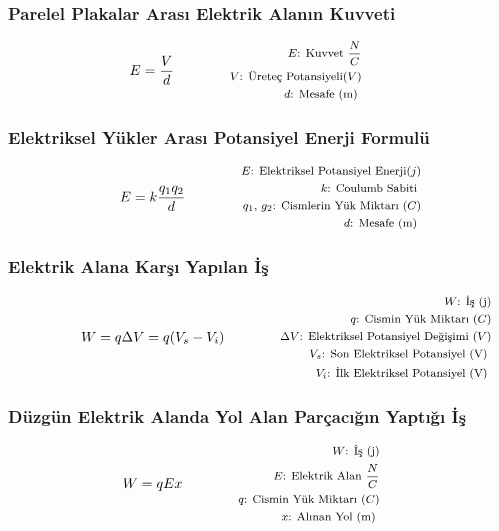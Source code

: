 \subsubsection*{Parelel Plakalar Arası Elektrik Alanın Kuvveti}
\begin{equation}
    E = \frac{V}{d} \qquad \qquad \parbox{4cm}{\footnotesize$\begin{aligned}
        E\text{: Kuvvet } \frac{N}{C} \\
        V\text{: Üreteç Potansiyeli} (V) \\
        d\text{: Mesafe (m) }
\end{aligned}$}
\end{equation}

\subsubsection*{Elektriksel Yükler Arası Potansiyel Enerji Formulü}
\begin{equation}
    E = k \frac{q_1 q_2}{d} \qquad \qquad \parbox{4cm}{\footnotesize$\begin{aligned}
        E\text{: Elektriksel Potansiyel Enerji} (j) \\
        k\text{: Coulumb Sabiti } \\
        q_1\text{, }g_2\text{: Cismlerin Yük Miktarı } (C) \\
        d\text{: Mesafe (m) }
\end{aligned}$}
\end{equation}

\subsubsection*{Elektrik Alana Karşı Yapılan İş}
\begin{equation}
    W = q \Delta V = q (V_s - V_i) \qquad \qquad \parbox{4cm}{\footnotesize$\begin{aligned}
        W\text{: İş (j)} \\
        q\text{: Cismin Yük Miktarı } (C) \\
        \Delta V\text{: Elektriksel Potansiyel Değişimi } (V) \\
        V_s\text{: Son Elektriksel Potansiyel (V) } \\
        V_i\text{: İlk Elektriksel Potansiyel (V) }
\end{aligned}$}
\end{equation}

\subsubsection*{Düzgün Elektrik Alanda Yol Alan Parçacığın Yaptığı İş}
\begin{equation}
    W = qEx\qquad \qquad \parbox{4cm}{\footnotesize$\begin{aligned}
        W\text{: İş (j)} \\
        E\text{: Elektrik Alan } \frac{N}{C} \\
        q\text{: Cismin Yük Miktarı } (C) \\
        x\text{: Alınan Yol (m) }
\end{aligned}$}
\end{equation}
